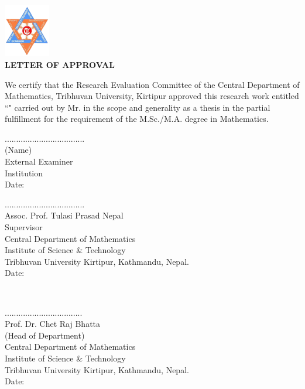 
 \begin{center}
 	\includegraphics[width=0.15\textwidth]{pictures/tulogo.png}\\[1.5cm]
 {\Large{\bfseries{LETTER OF APPROVAL}}}\\[.5cm]
\end{center}

\noindent
We certify that the Research Evaluation Committee of the Central Department of Mathematics, Tribhuvan University, Kirtipur approved this research work entitled ``\textbf{\thetitle}" carried out by Mr. \textbf{\theauthor} in the scope and generality as a thesis in the partial fulfillment for the requirement of the M.Sc./M.A. degree in Mathematics.
\\[3.5cm]
\begin{minipage}{0.45\textwidth}
		...................................\\
		(Name) \\
		External Examiner\\
		Institution \\[0.1cm]
		Date:
\end{minipage}
%
\begin{minipage}{0.6\textwidth}
	...................................\\
		Assoc. Prof. Tulasi Prasad Nepal \\
		Supervisor \\
		Central Department of Mathematics\\
                Institute of Science \& Technology\\
                Tribhuvan University
                Kirtipur, Kathmandu, Nepal.\\[0.1cm]
		Date: \thedate

\end{minipage}\\[3cm]

\begin{center}
..................................\\
Prof. Dr. Chet Raj Bhatta\\
	(Head of Department)\\
 Central Department of Mathematics\\
	 Institute of Science \& Technology\\
	 Tribhuvan University
	 Kirtipur, Kathmandu, Nepal.\\
	Date: \thedate
\end{center}
